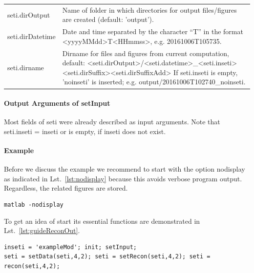 \documentclass[a4paper]{article}
\begin{document}
\noindent\begin{tabular}[t]{p{2.4cm} p{13.2cm}}
\textsf{seti.dirOutput} & Name of folder in which directories for output files/figures are created (default: \textsf{'output'}).\\
\textsf{seti.dirDatetime} & Date and time separated by the character ``T'' in the format \textsf{<yyyyMMdd>T<HHmmss>}, e.g. 20161006T105735.\\
\textsf{seti.dirname} & Dirname for files and figures from current computation, default:\newline
  \textsf{<seti.dirOutput>/<seti.datetime>\_<seti.inseti><seti.dirSuffix><seti.dirSuffixAdd>}\newline
  If \textsf{seti.inseti} is empty, \textsf{'noinseti'} is inserted; e.g. 
  \textsf{output/\allowbreak 20161006T102740\_noinseti}.\\
\end{tabular}

\paragraph{Output Arguments of \textsf{setInput}} Most fields of \textsf{seti} were already described as input arguments. Note that \textsf{seti.inseti = inseti} or is empty, if \textsf{inseti} does not exist.

\paragraph{Example} Before we discuss the example we recommend to start \MATLAB with the option \textsf{nodisplay} as indicated in Lst.~\ref{lst:nodisplay} because this avoids verbose program output. Regardless, the related figures are stored.

\begin{lstlisting}[caption={Using \MATLAB with the option \textsf{nodisplay}.},label=lst:nodisplay]
matlab -nodisplay
\end{lstlisting}

To get an idea of \textsf{start} its essential functions are demonstrated in Lst.~\ref{lst:guideReconOut}.

\begin{lstlisting}[caption={Variational reconstruction with messages and storing of figures/files (\emph{source code}: \textsf{guides/guideReconOut.m}).},label=lst:guideReconOut]
inseti = 'exampleMod'; init; setInput;
seti = setData(seti,4,2); seti = setRecon(seti,4,2); seti = recon(seti,4,2);
\end{lstlisting}
\end{document}
